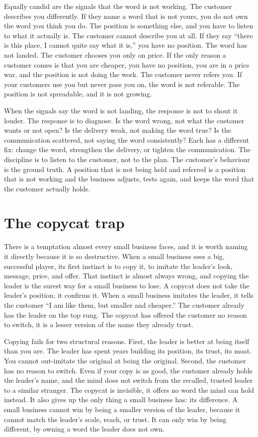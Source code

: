 \documentclass[10pt,twoside,openany]{memoir}
\begin{document}
{Equally candid are the signals that the word is not working. The
customer describes you differently. If they name a word that is not
yours, you do not own the word you think you do. The position is
something else, and you have to listen to what it actually is. The
customer cannot describe you at all. If they say ``there is this place,
I cannot quite say what it is,'' you have no position. The word has not
landed. The customer chooses you only on price. If the only reason a
customer comes is that you are cheaper, you have no position, you are in
a price war, and the position is not doing the work. The customer never
refers you. If your customers use you but never pass you on, the word is
not referable. The position is not spreadable, and it is not growing.

When the signals say the word is not landing, the response is not to
shout it louder. The response is to diagnose. Is the word wrong, not
what the customer wants or not open? Is the delivery weak, not making
the word true? Is the communication scattered, not saying the word
consistently? Each has a different fix: change the word, strengthen the
delivery, or tighten the communication. The discipline is to listen to
the customer, not to the plan. The customer's behaviour is the ground
truth. A position that is not being held and referred is a position that
is not working and the business adjusts, tests again, and keeps the word
that the customer actually holds.

\FloatBarrier
\chapter{The copycat trap}\label{the-copycat-trap}

There is a temptation almost every small business faces, and it is worth
naming it directly because it is so destructive. When a small business
sees a big, successful player, its first instinct is to copy it, to
imitate the leader's look, message, price, and offer. That instinct is
almost always wrong, and copying the leader is the surest way for a
small business to lose. A copycat does not take the leader's position;
it confirms it. When a small business imitates the leader, it tells the
customer ``I am like them, but smaller and cheaper.'' The customer
already has the leader on the top rung. The copycat has offered the
customer no reason to switch, it is a lesser version of the name they
already trust.

Copying fails for two structural reasons. First, the leader is better at
being itself than you are. The leader has spent years building its
position, its trust, its moat. You cannot out-imitate the original at
being the original. Second, the customer has no reason to switch. Even
if your copy is as good, the customer already holds the leader's name,
and the mind does not switch from the recalled, trusted leader to a
similar stranger. The copycat is invisible, it offers no word the mind
can hold instead. It also gives up the only thing a small business has:
its difference. A small business cannot win by being a smaller version
of the leader, because it cannot match the leader's scale, reach, or
trust. It can only win by being different, by owning a word the leader
does not own.

}
\end{document}
